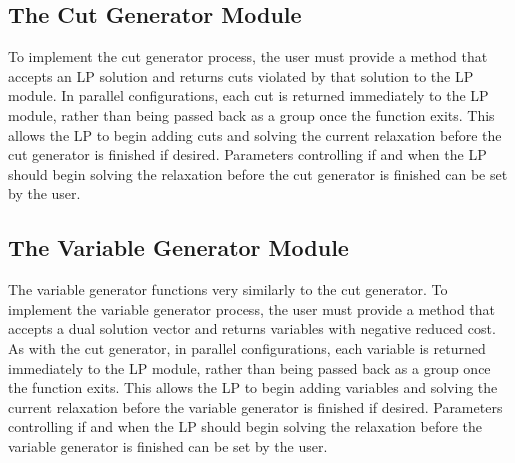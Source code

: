 \subsection{The Cut Generator Module}

To implement the cut generator process, the user must provide a
method that accepts an LP solution and returns cuts violated by that
solution to the LP module. In parallel configurations, each cut is
returned immediately to the LP module, rather than being passed back
as a group once the function exits. This allows the LP to begin adding
cuts and solving the current relaxation before the cut generator is
finished if desired. Parameters controlling if and when the LP should
begin solving the relaxation before the cut generator is finished can
be set by the user.

\subsection{The Variable Generator Module}

The variable generator functions very similarly to the cut generator.
To implement the variable generator process, the user must provide a
method that accepts a dual solution vector and returns variables
with negative reduced cost. As with the cut generator, in parallel
configurations, each variable is returned immediately to the LP
module, rather than being passed back as a group once the function
exits. This allows the LP to begin adding variables and solving the
current relaxation before the variable generator is finished if
desired. Parameters controlling if and when the LP should begin
solving the relaxation before the variable generator is finished can
be set by the user.

